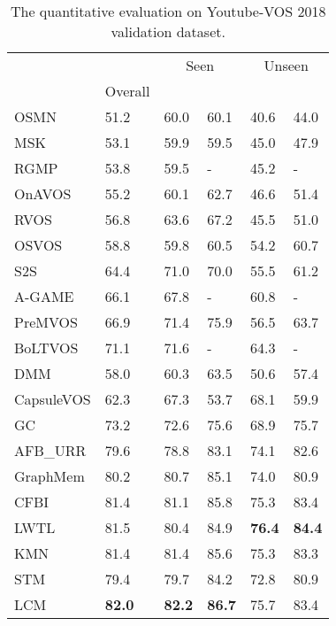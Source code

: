 \documentclass[final]{cvpr}
\begin{document}
\begin{table}
	\centering
	\begin{center}
\begin{tabular}{llllll} 
\hline
   &  &  \multicolumn{2}{c}{Seen} & \multicolumn{2}{c}{Unseen} \\  
   \cline{3-6}
   & Overall &  &  &  &  \\
\hline
OSMN\cite{osmn}            & 51.2 & 60.0 & 60.1 & 40.6 & 44.0 \\
MSK\cite{msk}              & 53.1 & 59.9 & 59.5 & 45.0 & 47.9 \\
RGMP\cite{rgmp}            & 53.8 & 59.5 & -    & 45.2 & -    \\
OnAVOS\cite{OnAVOS}        & 55.2 & 60.1 & 62.7 & 46.6 & 51.4 \\
RVOS\cite{rvos}            & 56.8 & 63.6 & 67.2 & 45.5 & 51.0 \\
OSVOS\cite{osvos}          & 58.8 & 59.8 & 60.5 & 54.2 & 60.7 \\
S2S\cite{s2s}              & 64.4 & 71.0 & 70.0 & 55.5 & 61.2 \\
A-GAME\cite{agame}         & 66.1 & 67.8 & -    & 60.8 & -    \\
PreMVOS\cite{premvos}      & 66.9 & 71.4 & 75.9 & 56.5 & 63.7 \\
BoLTVOS\cite{boltvos}      & 71.1 & 71.6 & -    & 64.3 & -    \\
DMM\cite{dmmnet}      & 58.0 & 60.3 & 63.5 & 50.6 & 57.4 \\
CapsuleVOS\cite{dmmnet} & 62.3 & 67.3 & 53.7 & 68.1 & 59.9 \\
GC\cite{GC}         & 73.2 & 72.6 & 75.6 & 68.9 & 75.7 \\
AFB\_URR\cite{AFB_URR}     & 79.6 & 78.8 & 83.1 & 74.1 & 82.6 \\
GraphMem\cite{GraphMem}    & 80.2 & 80.7 & 85.1 & 74.0 & 80.9 \\
CFBI\cite{cfbi}            & 81.4 & 81.1 & 85.8 & 75.3 & 83.4 \\
LWTL\cite{LWTL}            & 81.5 & 80.4 & 84.9 & \textbf{76.4} & \textbf{84.4} \\

KMN\cite{KMN}              & 81.4 & 81.4 & 85.6 & 75.3 & 83.3 \\

 
\hline 
STM\cite{STM}              & 79.4 & 79.7 & 84.2 & 72.8 & 80.9 \\
LCM                       & \textbf{82.0}   &  \textbf{82.2}  &  \textbf{86.7}  & 75.7   &  83.4  \\
\hline
\end{tabular}
\end{center} 	\caption{The quantitative evaluation on Youtube-VOS 2018 validation dataset.}
	\label{table:youtubevos}
\end{table}
\end{document}
